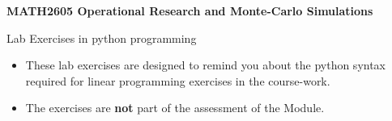 \documentclass[12pt,a4paper]{article}
\begin{document}
\sffamily 


\thispagestyle{empty}


\begin{center}
{\Huge{\textbf{MATH2605 Operational Research
and Monte-Carlo Simulations}}}

\vspace{1cm}

{\huge Lab Exercises in python programming}

\vspace{2cm}

\vfill

\end{center}




\begin{itemize}

\item These lab exercises are designed to remind you about the python syntax
      required for linear programming exercises in the course-work.


\item The exercises are \textbf{not} part of the assessment of the Module.

\end{itemize}

\newpage
\thispagestyle{empty}
\addtocounter{section}{0} %


 
 
 
 
 
\end{document}
